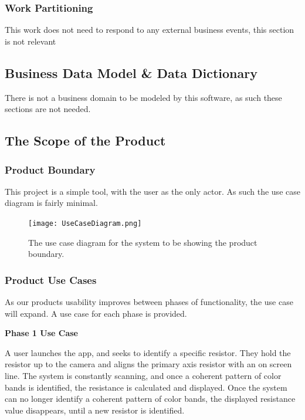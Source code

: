 \documentclass{article}
\begin{document}
\subsubsection{Work Partitioning}

This work does not need to respond to any external business events, this section is not relevant

\subsection{Business Data Model \& Data Dictionary}

There is not a business domain to be modeled by this software, as such these sections are not needed.

\subsection{The Scope of the Product}

\subsubsection{Product Boundary}
This project is a simple tool, with the user as the only actor.
As such the use case diagram is fairly minimal.

\begin{figure}[H]
    \texttt{[image: UseCaseDiagram.png]}
	\caption{The use case diagram for the system to be showing the product boundary.}
    \label{fig:use_case_diagram}
\end{figure}



\subsubsection{Product Use Cases}

As our products usability improves between phases of functionality, the use case will expand.
A use case for each phase is provided.

\textbf{ Phase 1 Use Case}

A user launches the app, and seeks to identify a specific resistor.
They hold the resistor up to the camera and aligns the primary axis resistor with an on screen line.
The system is constantly scanning, and once a coherent pattern of color bands is identified, the resistance is calculated and displayed.
Once the system can no longer identify a coherent pattern of color bands, the displayed resistance value disappears, until a new resistor is identified.
\end{document}

